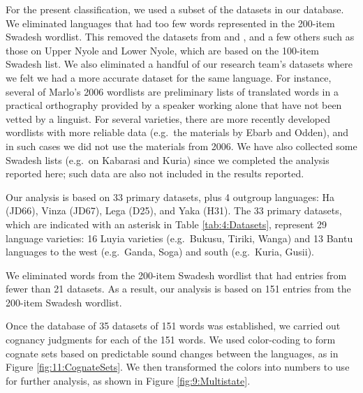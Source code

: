 \documentclass[output=paper]{langscibook}
\begin{document}
\begin{sloppypar}
For the present classification, we used a subset of the datasets in our database. We eliminated languages that had too few words represented in the 200-item Swadesh wordlist. This removed the datasets from \citet{brown_phonological_1972} and \citet{mould_comparative_1976}, and a few others such as those on Upper Nyole and Lower Nyole, which are based on the 100-item Swadesh list. We also eliminated a handful of our research team’s datasets where we felt we had a more accurate dataset for the same language. For instance, several of Marlo’s 2006 wordlists are preliminary lists of translated words in a practical orthography provided by a speaker working alone that have not been vetted by a linguist. For several varieties, there are more recently developed wordlists with more reliable data (e.g.\ the materials by Ebarb and Odden), and in such cases we did not use the materials from 2006. We have also collected some Swadesh lists (e.g.\ on Kabarasi and Kuria) since we completed the analysis reported here; such data are also not included in the results reported.\end{sloppypar}

Our analysis is based on 33 primary datasets, plus 4 outgroup languages: Ha (JD66), Vinza (JD67), Lega (D25), and Yaka (H31). The 33 primary datasets, which are indicated with an asterisk in Table \ref{tab:4:Datasets}, represent 29 language varieties: 16 Luyia varieties (e.g.\ Bukusu, Tiriki, Wanga) and 13 Bantu languages to the west (e.g.\ Ganda, Soga) and south (e.g.\ Kuria, Gusii). 

We eliminated words from the 200-item Swadesh wordlist that had entries from fewer than 21 datasets. As a result, our analysis is based on 151 entries from the 200-item Swadesh wordlist.  

Once the database of 35 datasets of 151 words was established, we carried out cognancy judgments for each of the 151 words. We used color-coding to form cognate sets based on predictable sound changes between the languages, as in Figure \ref{fig:11:CognateSets}. We then transformed the colors into numbers to use for further analysis, as shown in Figure \ref{fig:9:Multistate}.  
\end{document}
